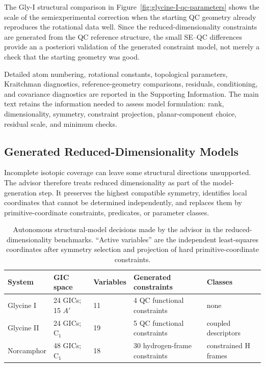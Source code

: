 \documentclass[aip,jcp,reprint,longbibliography,floatfix]{revtex4-2}
\begin{document}
The Gly-I structural comparison in
Figure~\ref{fig:glycine-I-qc-parameters} shows the scale of the
semiexperimental correction when the starting QC geometry already reproduces
the rotational data well. Since the reduced-dimensionality constraints are
generated from the QC reference structure, the small SE--QC differences
provide an a posteriori validation of the generated constraint
model, not merely a check that the starting geometry was good.

Detailed atom numbering, rotational constants, topological parameters,
Kraitchman diagnostics, reference-geometry comparisons, residuals, conditioning, and
covariance diagnostics are reported in the Supporting Information. The main text
retains the information needed to
assess model formulation: rank, dimensionality, symmetry, constraint
projection, planar-component choice, residual scale, and minimum checks.

\subsection{Generated Reduced-Dimensionality Models}

Incomplete isotopic coverage can leave some structural directions unsupported.
The advisor therefore treats reduced dimensionality as part of the
model-generation step. It preserves the highest compatible symmetry, identifies
local coordinates that cannot be determined independently, and replaces them
by primitive-coordinate constraints, predicates, or parameter classes.

\begin{table}
\caption{Autonomous structural-model decisions made by the advisor in the
reduced-dimensionality benchmarks. ``Active variables'' are the
independent least-squares coordinates after symmetry selection and projection
of hard primitive-coordinate constraints.}
\label{tab:advisor-decisions}
\scriptsize
\setlength{\tabcolsep}{2.5pt}
\begin{tabular}{lllll}
\toprule
System & GIC space & Variables & Generated constraints & Classes \\
\midrule
Glycine I & 24 GICs; 15 $A'$ & 11 & 4 QC functional constraints & none \\
Glycine II & 24 GICs; C$_1$ & 19 & 5 QC functional constraints & coupled descriptors \\
Norcamphor & 48 GICs; C$_1$ & 18 & 30 hydrogen-frame constraints & constrained H frames \\
\bottomrule
\end{tabular}
\end{table}
\end{document}

